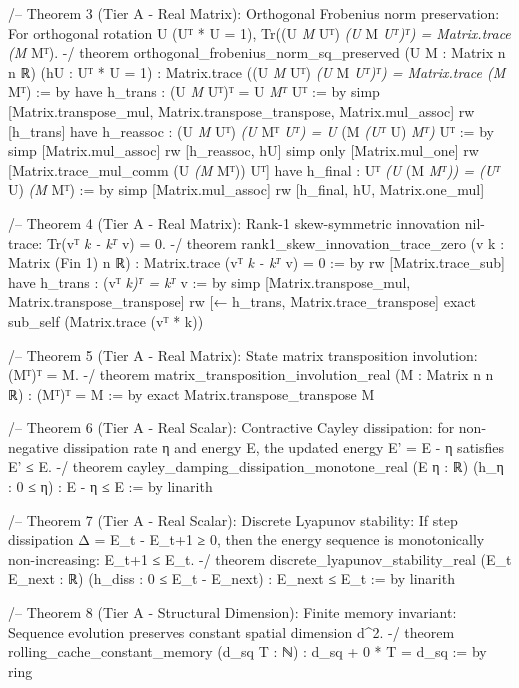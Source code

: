 \documentclass[11pt,twoside,openright]{amsbook}
\begin{document}
{{{{{{{/-- Theorem 3 (Tier A - Real Matrix):
    Orthogonal Frobenius norm preservation: For orthogonal rotation U (Uᵀ * U = 1),
    Tr((U \textit{ M } Uᵀ) \textit{ (U } M \textit{ Uᵀ)ᵀ) = Matrix.trace (M } Mᵀ). -/
theorem orthogonal_frobenius_norm_sq_preserved (U M : Matrix n n ℝ)
    (hU : Uᵀ * U = 1) :
    Matrix.trace ((U \textit{ M } Uᵀ) \textit{ (U } M \textit{ Uᵀ)ᵀ) = Matrix.trace (M } Mᵀ) := by
  have h_trans : (U \textit{ M } Uᵀ)ᵀ = U \textit{ Mᵀ } Uᵀ := by
    simp [Matrix.transpose_mul, Matrix.transpose_transpose, Matrix.mul_assoc]
  rw [h_trans]
  have h_reassoc : (U \textit{ M } Uᵀ) \textit{ (U } Mᵀ \textit{ Uᵀ) = U } (M \textit{ (Uᵀ } U) \textit{ Mᵀ) } Uᵀ := by
    simp [Matrix.mul_assoc]
  rw [h_reassoc, hU]
  simp only [Matrix.mul_one]
  rw [Matrix.trace_mul_comm (U \textit{ (M } Mᵀ)) Uᵀ]
  have h_final : Uᵀ \textit{ (U } (M \textit{ Mᵀ)) = (Uᵀ } U) \textit{ (M } Mᵀ) := by simp [Matrix.mul_assoc]
  rw [h_final, hU, Matrix.one_mul]

/-- Theorem 4 (Tier A - Real Matrix):
    Rank-1 skew-symmetric innovation nil-trace: Tr(vᵀ \textit{ k - kᵀ } v) = 0. -/
theorem rank1_skew_innovation_trace_zero (v k : Matrix (Fin 1) n ℝ) :
    Matrix.trace (vᵀ \textit{ k - kᵀ } v) = 0 := by
  rw [Matrix.trace_sub]
  have h_trans : (vᵀ \textit{ k)ᵀ = kᵀ } v := by
    simp [Matrix.transpose_mul, Matrix.transpose_transpose]
  rw [← h_trans, Matrix.trace_transpose]
  exact sub_self (Matrix.trace (vᵀ * k))

/-- Theorem 5 (Tier A - Real Matrix):
    State matrix transposition involution: (Mᵀ)ᵀ = M. -/
theorem matrix_transposition_involution_real (M : Matrix n n ℝ) :
    (Mᵀ)ᵀ = M := by
  exact Matrix.transpose_transpose M

/-- Theorem 6 (Tier A - Real Scalar):
    Contractive Cayley dissipation: for non-negative dissipation rate η and energy E,
    the updated energy E' = E - η satisfies E' ≤ E. -/
theorem cayley_damping_dissipation_monotone_real (E η : ℝ) (h_η : 0 ≤ η) :
    E - η ≤ E := by
  linarith

/-- Theorem 7 (Tier A - Real Scalar):
    Discrete Lyapunov stability: If step dissipation Δ = E_t - E_{t+1} ≥ 0,
    then the energy sequence is monotonically non-increasing: E_{t+1} ≤ E_t. -/
theorem discrete_lyapunov_stability_real (E_t E_next : ℝ) (h_diss : 0 ≤ E_t - E_next) :
    E_next ≤ E_t := by
  linarith

/-- Theorem 8 (Tier A - Structural Dimension):
    Finite memory invariant: Sequence evolution preserves constant spatial dimension d^2. -/
theorem rolling_cache_constant_memory (d_sq T : ℕ) :
    d_sq + 0 * T = d_sq := by
  ring

}}}}}}}
\end{document}
